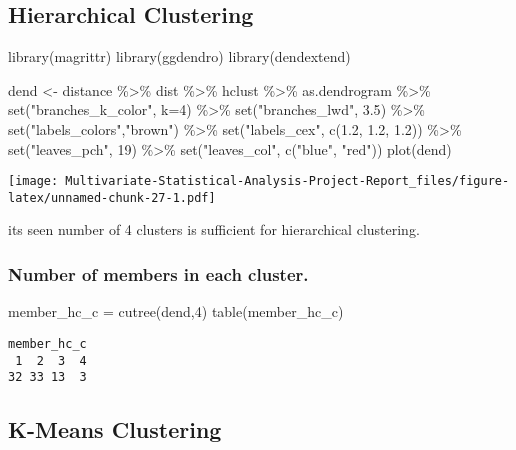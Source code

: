 \documentclass[12pt,twoside]{deuthesis}
\newenvironment{Shaded}{\begin{snugshade}}{\end{snugshade}}
\newcommand{\AttributeTok}[1]{\textcolor[rgb]{0.77,0.63,0.00}{#1}}
\newcommand{\DecValTok}[1]{\textcolor[rgb]{0.00,0.00,0.81}{#1}}
\newcommand{\FloatTok}[1]{\textcolor[rgb]{0.00,0.00,0.81}{#1}}
\newcommand{\FunctionTok}[1]{\textcolor[rgb]{0.00,0.00,0.00}{#1}}
\newcommand{\NormalTok}[1]{#1}
\newcommand{\OtherTok}[1]{\textcolor[rgb]{0.56,0.35,0.01}{#1}}
\newcommand{\SpecialCharTok}[1]{\textcolor[rgb]{0.00,0.00,0.00}{#1}}
\newcommand{\StringTok}[1]{\textcolor[rgb]{0.31,0.60,0.02}{#1}}
\begin{document}
\hypertarget{hierarchical-clustering}{%
\subsection{Hierarchical Clustering}\label{hierarchical-clustering}}
\begin{Shaded}
\begin{Highlighting}[]
\FunctionTok{library}\NormalTok{(magrittr)}
\FunctionTok{library}\NormalTok{(ggdendro)}
\FunctionTok{library}\NormalTok{(dendextend)}

\NormalTok{dend }\OtherTok{\textless{}{-}}\NormalTok{ distance }\SpecialCharTok{\%\textgreater{}\%}\NormalTok{ dist }\SpecialCharTok{\%\textgreater{}\%}\NormalTok{ hclust }\SpecialCharTok{\%\textgreater{}\%}\NormalTok{ as.dendrogram }\SpecialCharTok{\%\textgreater{}\%} \FunctionTok{set}\NormalTok{(}\StringTok{"branches\_k\_color"}\NormalTok{, }\AttributeTok{k=}\DecValTok{4}\NormalTok{) }\SpecialCharTok{\%\textgreater{}\%} \FunctionTok{set}\NormalTok{(}\StringTok{"branches\_lwd"}\NormalTok{, }\FloatTok{3.5}\NormalTok{) }\SpecialCharTok{\%\textgreater{}\%} \FunctionTok{set}\NormalTok{(}\StringTok{"labels\_colors"}\NormalTok{,}\StringTok{"brown"}\NormalTok{) }\SpecialCharTok{\%\textgreater{}\%} \FunctionTok{set}\NormalTok{(}\StringTok{"labels\_cex"}\NormalTok{, }\FunctionTok{c}\NormalTok{(}\FloatTok{1.2}\NormalTok{, }\FloatTok{1.2}\NormalTok{, }\FloatTok{1.2}\NormalTok{)) }\SpecialCharTok{\%\textgreater{}\%} \FunctionTok{set}\NormalTok{(}\StringTok{"leaves\_pch"}\NormalTok{, }\DecValTok{19}\NormalTok{) }\SpecialCharTok{\%\textgreater{}\%} \FunctionTok{set}\NormalTok{(}\StringTok{"leaves\_col"}\NormalTok{, }\FunctionTok{c}\NormalTok{(}\StringTok{"blue"}\NormalTok{, }\StringTok{"red"}\NormalTok{))}
\FunctionTok{plot}\NormalTok{(dend)}
\end{Highlighting}
\end{Shaded}
\texttt{[image: Multivariate-Statistical-Analysis-Project-Report\_files/figure-latex/unnamed-chunk-27-1.pdf]}\\
\setlength{\parindent}{0in}

its seen number of 4 clusters is sufficient for hierarchical clustering.

\hypertarget{number-of-members-in-each-cluster.}{%
\subsubsection{Number of members in each cluster.}\label{number-of-members-in-each-cluster.}}
\begin{Shaded}
\begin{Highlighting}[]
\NormalTok{member\_hc\_c }\OtherTok{=} \FunctionTok{cutree}\NormalTok{(dend,}\DecValTok{4}\NormalTok{)}
\FunctionTok{table}\NormalTok{(member\_hc\_c)}
\end{Highlighting}
\end{Shaded}
\begin{verbatim}
member_hc_c
 1  2  3  4 
32 33 13  3 
\end{verbatim}
\hypertarget{k-means-clustering}{%
\subsection{K-Means Clustering}\label{k-means-clustering}}
\end{document}
